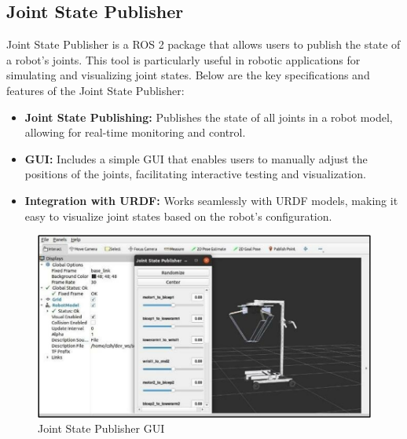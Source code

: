 \subsection{\fontsize{14}{16} Joint State Publisher}
{
	\fontsize{12}{14}
	Joint State Publisher is a ROS 2 package that allows users to publish the state of a robot's joints.
	This tool is particularly useful in robotic applications for simulating and visualizing joint states.
	Below are the key specifications and features of the Joint State Publisher:
	\begin{itemize}
		\item \textbf{Joint State Publishing:} Publishes the state of all joints in a robot model, allowing for
		real-time monitoring and control.
		\item \textbf{GUI:} Includes a simple GUI that enables users to manually adjust the positions of the
		joints, facilitating interactive testing and visualization.
		\item \textbf{Integration with URDF:} Works seamlessly with URDF models, making it easy to
		visualize joint states based on the robot's configuration.
	\end{itemize}
	
	\begin{figure}[H]
		\centering
		\includegraphics{images/Content/jspgui}
		\caption{Joint State Publisher GUI \cite{jointstatepub}} 
		\label{fig:jspgui}
	\end{figure}
}

